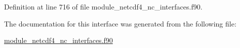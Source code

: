 Definition at line 716 of file module\+\_\+netcdf4\+\_\+nc\+\_\+interfaces.\+f90.



The documentation for this interface was generated from the following file\+:\begin{DoxyCompactItemize}
\item 
\hyperlink{module__netcdf4__nc__interfaces_8f90}{module\+\_\+netcdf4\+\_\+nc\+\_\+interfaces.\+f90}\end{DoxyCompactItemize}
